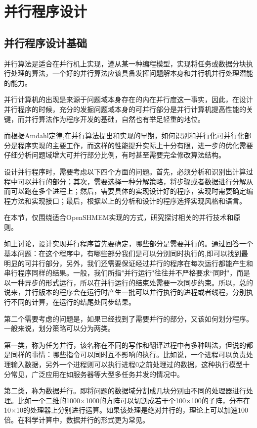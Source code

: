 \chapter{并行程序设计}
\label{chap:parallel_programming}
\section{并行程序设计基础}
并行算法是适合在并行机上实现，遵从某一种编程模型，实现将任务或数据分块执行处理的算法，一个好的并行算法应该具备发挥问题解本身和并行机并行处理潜能的能力。

并行计算机的出现是来源于问题域本身存在的内在并行度这一事实，因此，在设计并行程序的时候，充分的发掘问题域本身的可并行部分是并行计算机提高性能的关键，而并行算法作为程序开发的基础，自然也有举足轻重的地位\cite{book:zhang}。

而根据Amdahl定律\cite{book:intro},在并行算法提出和实现的早期，如何识别和并行化可并行化部分是程序实现的主要工作，而这样的性能提升实际上十分有限，进一步的优化需要仔细分析问题域增大可并行部分比例，有时甚至需要完全修改算法结构。

设计并行程序时，需要考虑以下四个方面的问题。首先，必须分析和识别出计算过程中可以并行的部分；其次，需要选择一种分解策略，将步骤或者数据进行分解从而可以跑在多个进程上；然后，需要具体的实现设计好的程序，实现时需要确定编程方法和实现接口；最后，根据以上的分析和设计的程序选择实现风格和语言。

在本节，仅围绕适合OpenSHMEM实现的方式，研究探讨相关的并行技术和原则。

如上讨论，设计实现并行程序首先要确定，哪些部分是需要并行的。通过回答一个基本问题：在这个程序中，有哪些部分我们是可以分别同时执行的,即可以找到最明显的可并行部分，另外，我们还需要保证经过并行的程序在每次运行都能产生和串行程序同样的结果。一般，我们所指"并行运行"往往并不严格要求“同时"，而是以一种异步的形式运行，所以在并行运行的结束处需要一次同步约束。所以，总的说来，并行版本的程序会在运行时产生一批可以并行执行的进程或者线程，分别执行不同的计算，在运行的结尾处同步结果。

第二个需要考虑的问题是，如果已经找到了需要并行的部分，又该如何划分程序。一般来说，划分策略可以分为两类。

第一类，称为任务并行，该名称在不同的写作和翻译过程中有多种叫法，但说的都是同样的事情：哪些指令可以同时互不影响的执行。比如说，一个进程可以负责处理输入数据，另外一个进程则可以执行进程0之前处理过的数据，这种执行模型十分常见，广泛应用在如服务器等大型多任务并发的情况中。

第二类，称为数据并行。即将问题的数据域分割成几块分别由不同的处理器进行处理。比如一个二维的1000$\times$1000的方阵可以切割成若干个100$\times$100的子阵，分布在10$\times$10的处理器上分别进行运算。如果该处理是绝对并行的，理论上可以加速100倍。在科学计算中，数据并行的形式更为常见。

